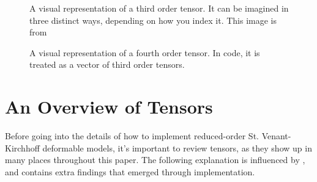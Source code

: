 \documentclass[twocolumn,10pt]{asme2ej}
\begin{document}
\begin{figure}
\caption{A visual representation of a third order tensor. It can be imagined in three distinct ways, depending on how you index it. This image is from \cite{tensors}}
\label{fig_ex1.png}
\end{figure}
\begin{figure}
\caption{A visual representation of a fourth order tensor. In code, it is treated as a vector of third order tensors.}
\label{fig_ex2.png}
\end{figure}

\section{An Overview of Tensors}

Before going into the details of how to implement reduced-order St. Venant-Kirchhoff deformable models, it's important to review tensors, as they show up in many places throughout this paper. The following explanation is influenced by \cite{tensors}, and contains extra findings that emerged through implementation.
\end{document}
